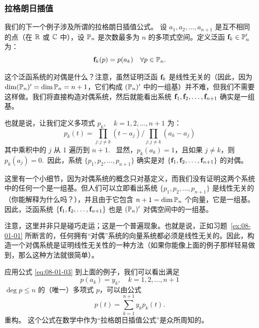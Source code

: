 \subsubsection{拉格朗日插值}\label{sec:08-01-04-02}

我们的下一个例子涉及所谓的拉格朗日插值公式。
设 $a_1, a_2, \dots, a_{n+1}$ 是互不相同的点（在 $\mathbb{R}$ 或 $\mathbb{C}$ 中），设 $\mathbb{P}_n$ 是次数最多为 $n$ 的多项式空间。定义泛函 $\mathbf{f}_k \in \mathbb{P}'_n$ 为：
$$ \mathbf{f}_k(p) = p(a_k) \quad \forall p \in \mathbb{P}_n .$$

这个泛函系统的对偶是什么？注意，虽然证明泛函 $\mathbf{f}_k$ 是线性无关的（因此，因为 $\dim(\mathbb{P}_n)' = \dim \mathbb{P}_n = n+1$，它们构成 $(\mathbb{P}_n)'$ 中的一组基）并不难，但我们不需要这样做。我们将直接构造对偶系统，然后就能看出系统 $\mathbf{f}_1, \mathbf{f}_2, \dots, \mathbf{f}_{n+1}$ 确实是一组基。

也就是说，让我们定义多项式 $p_k,\quad k = 1, 2, \dots, n+1$ 为：
$$ p_k(t) = \prod_{j: j \neq k} (t - a_j) / \prod_{j: j \neq k} (a_k - a_j) $$
其中乘积中的 $j$ 从 1 遍历到 $n+1$.~
显然，$p_k(a_k) = 1$，且如果 $j \neq k$，则 $p_k(a_j) = 0$.~因此，系统 $\{p_1, p_2, \dots, p_{n+1}\}$ 确实是对 $\{\mathbf{f}_1, \mathbf{f}_2, \dots, \mathbf{f}_{n+1}\}$ 的对偶。

这里有一个小细节，因为对偶系统的概念只对基定义，而我们没有证明这两个系统中的任何一个是一组基。但人们可以立即看出系统 $\{p_1, p_2, \dots, p_{n+1}\}$ 是线性无关的（你能解释为什么吗？），并且由于它包含 $n+1 = \dim \mathbb{P}_n$ 个向量，它是一组基。因此，泛函系统 $\{\mathbf{f}_1, \mathbf{f}_2, \dots, \mathbf{f}_{n+1}\}$ 也是 $(\mathbb{P}_n)'$ 对偶空间中的一组基。

\begin{remark*}
注意，这里并非只是碰巧走运；这是一个普遍现象。也就是说，正如习题~\ref{ex:08-01-01} 所断言的，任何拥有“对偶”系统的向量系统都必须是线性无关的。因此，构造一个对偶系统是证明线性无关性的一种方法（如果你能像上面的例子那样轻易做到，那么这种方法就很简单）。
\end{remark*}

应用公式 \eqref{eq:08-01-03} 到上面的例子，我们可以看出满足\begin{equation}\label{eq:08-01-05}
p(a_k)=y_k,\quad k=1, 2, \dots, n+1
\end{equation}
$\deg p \le n$ 的（唯一）多项式 $p$，可以由公式
\begin{equation}\label{eq:08-01-06}
p(t) = \sum_{k=1}^{n+1} y_k p_k(t).
\end{equation}
重构。
这个公式在数学中作为“拉格朗日插值公式”是众所周知的。

